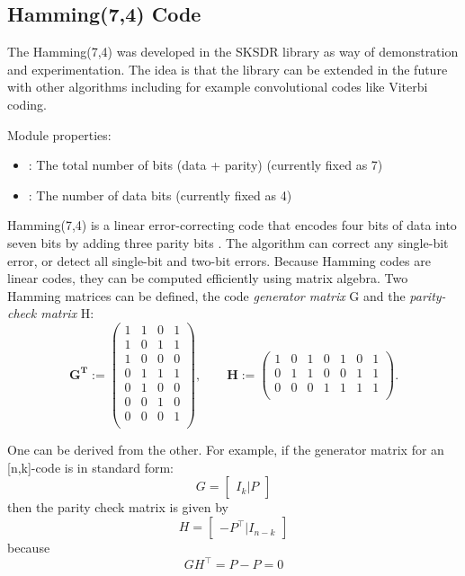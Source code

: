 \subsection{Hamming(7,4) Code}

The Hamming(7,4) was developed in the SKSDR library as way of demonstration and experimentation. The idea is that the library can be extended in the future with other algorithms including for example convolutional codes like Viterbi coding.

\noindent Module properties:
\begin{itemize}
  \item {}: The total number of bits (data + parity) (currently fixed as 7)
  \item {}: The number of data bits (currently fixed as 4)
\end{itemize}

Hamming(7,4) is a linear error-correcting code that encodes four bits of data into seven bits by adding three parity bits \cite{wikipedia_hamming}. The algorithm can correct any single-bit error, or detect all single-bit and two-bit errors. Because Hamming codes are linear codes, they can be computed efficiently using matrix algebra. Two Hamming matrices can be defined, the code \emph{generator matrix} G and the \emph{parity-check matrix} H:
\begin{equation}
\mathbf{G^T} := \begin{pmatrix}
  1 & 1 & 0 & 1 \\
  1 & 0 & 1 & 1 \\
  1 & 0 & 0 & 0 \\
  0 & 1 & 1 & 1 \\
  0 & 1 & 0 & 0 \\
  0 & 0 & 1 & 0 \\
  0 & 0 & 0 & 1 \\
 \end{pmatrix}, \qquad \mathbf{H} := \begin{pmatrix}
  1 & 0 & 1 & 0 & 1 & 0 & 1 \\
  0 & 1 & 1 & 0 & 0 & 1 & 1 \\
  0 & 0 & 0 & 1 & 1 & 1 & 1 \\
 \end{pmatrix}.
\end{equation}

One can be derived from the other. For example, if the generator matrix for an [n,k]-code is in standard form:
\begin{equation}
  G = \begin{bmatrix} I_k | P \end{bmatrix}
\end{equation}
then the parity check matrix is given by
\begin{equation}
  H = \begin{bmatrix} -P^{\top} | I_{n-k} \end{bmatrix}
\end{equation}
because
\begin{equation}
G H^{\top} = P-P = 0
\end{equation}

